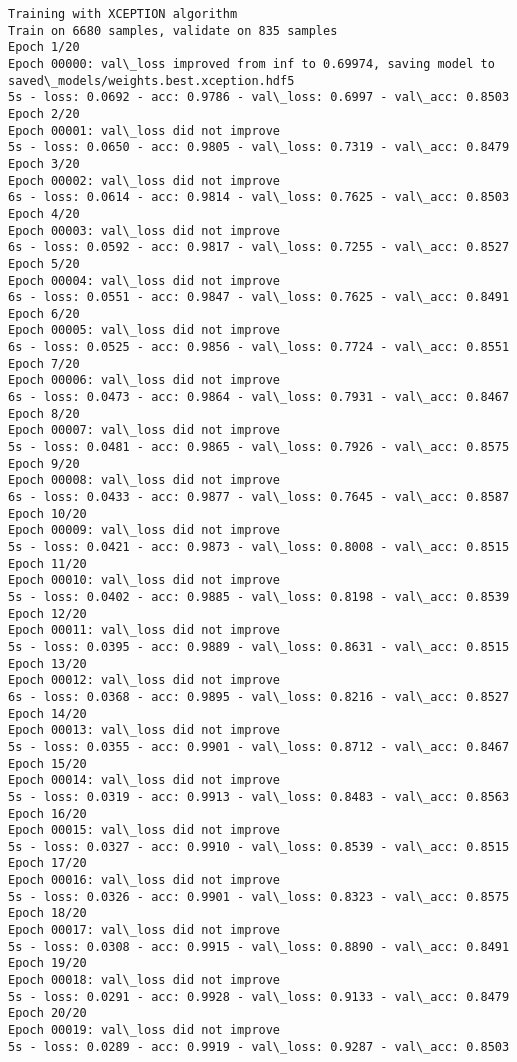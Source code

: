 \documentclass[11pt]{article}
\begin{document}
\begin{Verbatim}[commandchars=\\\{\}]
Training with XCEPTION algorithm
Train on 6680 samples, validate on 835 samples
Epoch 1/20
Epoch 00000: val\_loss improved from inf to 0.69974, saving model to saved\_models/weights.best.xception.hdf5
5s - loss: 0.0692 - acc: 0.9786 - val\_loss: 0.6997 - val\_acc: 0.8503
Epoch 2/20
Epoch 00001: val\_loss did not improve
5s - loss: 0.0650 - acc: 0.9805 - val\_loss: 0.7319 - val\_acc: 0.8479
Epoch 3/20
Epoch 00002: val\_loss did not improve
6s - loss: 0.0614 - acc: 0.9814 - val\_loss: 0.7625 - val\_acc: 0.8503
Epoch 4/20
Epoch 00003: val\_loss did not improve
6s - loss: 0.0592 - acc: 0.9817 - val\_loss: 0.7255 - val\_acc: 0.8527
Epoch 5/20
Epoch 00004: val\_loss did not improve
6s - loss: 0.0551 - acc: 0.9847 - val\_loss: 0.7625 - val\_acc: 0.8491
Epoch 6/20
Epoch 00005: val\_loss did not improve
6s - loss: 0.0525 - acc: 0.9856 - val\_loss: 0.7724 - val\_acc: 0.8551
Epoch 7/20
Epoch 00006: val\_loss did not improve
6s - loss: 0.0473 - acc: 0.9864 - val\_loss: 0.7931 - val\_acc: 0.8467
Epoch 8/20
Epoch 00007: val\_loss did not improve
5s - loss: 0.0481 - acc: 0.9865 - val\_loss: 0.7926 - val\_acc: 0.8575
Epoch 9/20
Epoch 00008: val\_loss did not improve
6s - loss: 0.0433 - acc: 0.9877 - val\_loss: 0.7645 - val\_acc: 0.8587
Epoch 10/20
Epoch 00009: val\_loss did not improve
5s - loss: 0.0421 - acc: 0.9873 - val\_loss: 0.8008 - val\_acc: 0.8515
Epoch 11/20
Epoch 00010: val\_loss did not improve
5s - loss: 0.0402 - acc: 0.9885 - val\_loss: 0.8198 - val\_acc: 0.8539
Epoch 12/20
Epoch 00011: val\_loss did not improve
5s - loss: 0.0395 - acc: 0.9889 - val\_loss: 0.8631 - val\_acc: 0.8515
Epoch 13/20
Epoch 00012: val\_loss did not improve
6s - loss: 0.0368 - acc: 0.9895 - val\_loss: 0.8216 - val\_acc: 0.8527
Epoch 14/20
Epoch 00013: val\_loss did not improve
5s - loss: 0.0355 - acc: 0.9901 - val\_loss: 0.8712 - val\_acc: 0.8467
Epoch 15/20
Epoch 00014: val\_loss did not improve
5s - loss: 0.0319 - acc: 0.9913 - val\_loss: 0.8483 - val\_acc: 0.8563
Epoch 16/20
Epoch 00015: val\_loss did not improve
5s - loss: 0.0327 - acc: 0.9910 - val\_loss: 0.8539 - val\_acc: 0.8515
Epoch 17/20
Epoch 00016: val\_loss did not improve
5s - loss: 0.0326 - acc: 0.9901 - val\_loss: 0.8323 - val\_acc: 0.8575
Epoch 18/20
Epoch 00017: val\_loss did not improve
5s - loss: 0.0308 - acc: 0.9915 - val\_loss: 0.8890 - val\_acc: 0.8491
Epoch 19/20
Epoch 00018: val\_loss did not improve
5s - loss: 0.0291 - acc: 0.9928 - val\_loss: 0.9133 - val\_acc: 0.8479
Epoch 20/20
Epoch 00019: val\_loss did not improve
5s - loss: 0.0289 - acc: 0.9919 - val\_loss: 0.9287 - val\_acc: 0.8503



\end{Verbatim}
\end{document}
